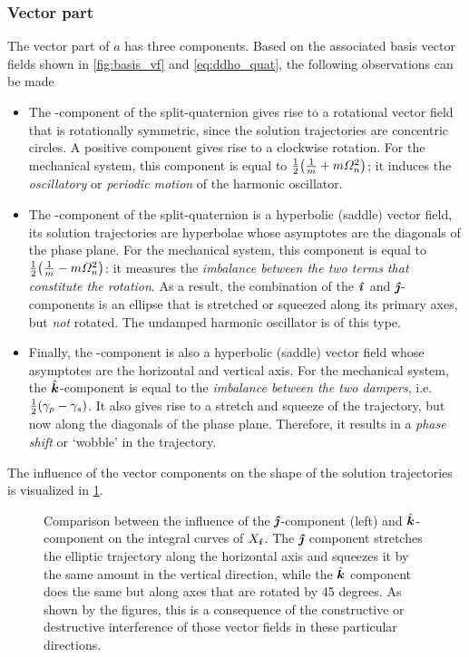 \subsubsection{Vector part} 
The vector part of \(a\) has three components. Based on the associated basis vector fields shown in \cref{fig:basis_vf} and \cref{eq:ddho_quat}, the following observations can be made
\begin{itemize}
    \item The \quati-component of the split-quaternion gives rise to a rotational vector field that is rotationally symmetric, since the solution trajectories are concentric circles. A positive component gives rise to a clockwise rotation. For the mechanical system, this component is equal to \(\frac{1}{2}\qty(\tfrac{1}{m} + m\Omega_n^2)\); it induces the \emph{oscillatory} or \emph{periodic motion} of the harmonic oscillator.
    \item The \quatj-component of the split-quaternion is a hyperbolic (saddle) vector field, its solution trajectories are hyperbolae whose asymptotes are the diagonals of the phase plane. For the mechanical system, this component is equal to \(\tfrac{1}{2}\qty(\tfrac{1}{m} - m\Omega_n^2)\): it measures the \emph{imbalance between the two terms that constitute the rotation}. As a result, the combination of the \(\quati\) and \(\quatj\)-components is an ellipse that is stretched or squeezed along its primary axes, but \emph{not} rotated. The undamped harmonic oscillator is of this type.
    \item Finally, the \quatk-component is also a hyperbolic (saddle) vector field whose asymptotes are the horizontal and vertical axis. For the mechanical system, the \(\quatk\)-component is equal to the \emph{imbalance between the two dampers}, i.e. \(\frac{1}{2}\qty(\gamma_p - \gamma_s)\). It also gives rise to a stretch and squeeze of the trajectory, but now along the diagonals of the phase plane. Therefore, it results in a \emph{phase shift} or `wobble' in the trajectory.
\end{itemize}
The influence of the vector components on the shape of the solution trajectories is visualized in \cref{fig:vector_components}.

\begin{figure}[ht]
    \centering
    
    \caption{Comparison between the influence of the \(\quatj\)-component (left) and \(\quatk\)-component on the integral curves of \(X_\quati\). The \(\quatj\) component stretches the elliptic trajectory along the horizontal axis and squeezes it by the same amount in the vertical direction, while the \(\quatk\) component does the same but along axes that are rotated by 45 degrees. As shown by the figures, this is a consequence of the constructive or destructive interference of those vector fields in these particular directions.}
    \label{fig:vector_components}
\end{figure}

